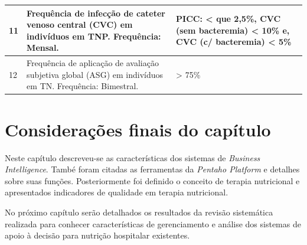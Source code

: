 \begin{quadro}[htb]
\begin{tabular}{|p{1cm}|p{9cm}|p{5cm}|}
    11 & Frequência de infecção de cateter venoso central (CVC) em indivíduos em
TNP. \newline Frequência: Mensal. & PICC: < que 2,5\%, CVC (sem bacteremia) < 10\% e, CVC (c/ bacteremia) < 5\% \\ \hline
    12 & Frequência de aplicação de avaliação subjetiva global (ASG) em indivíduos em
TN. \newline Frequência: Bimestral. & > 75\% \\ \hline
\end{tabular}
\end{quadro}

\section{Considerações finais do capítulo}
Neste capítulo descreveu-se as características dos sistemas de \textit{Business Intelligence}. També foram citadas as ferramentas da \textit{Pentaho Platform} e detalhes sobre suas funções. Posteriormente foi definido o conceito de terapia nutricional e apresentados indicadores de qualidade em terapia nutricional.

No próximo capítulo serão detalhados os resultados da revisão sistemática realizada para conhecer características de gerenciamento e análise dos sistemas de apoio à decisão para nutrição hospitalar existentes.